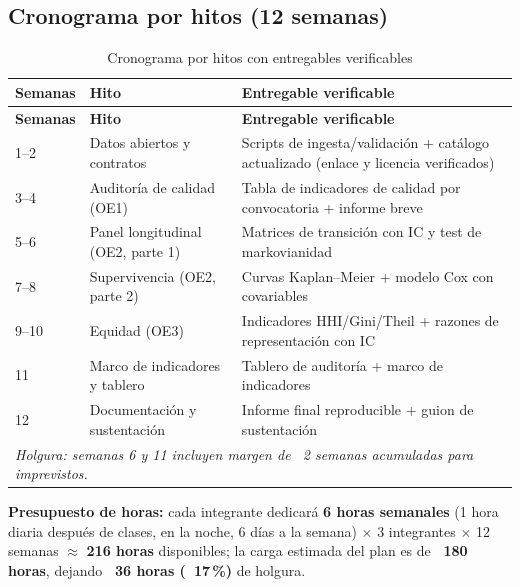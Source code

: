 \subsection{Cronograma por hitos (12 semanas)}

\begin{longtable}{p{2.1cm}p{6.4cm}p{4.9cm}}
\caption{Cronograma por hitos con entregables verificables}
\label{tab:cronograma}\\
\toprule
\textbf{Semanas} & \textbf{Hito} & \textbf{Entregable verificable} \\
\midrule
\endfirsthead
\toprule
\textbf{Semanas} & \textbf{Hito} & \textbf{Entregable verificable} \\
\midrule
\endhead
1--2 & Datos abiertos y contratos & Scripts de ingesta/validación + catálogo actualizado (enlace y licencia verificados) \\
3--4 & Auditoría de calidad (OE1) & Tabla de indicadores de calidad por convocatoria + informe breve \\
5--6 & Panel longitudinal (OE2, parte 1) & Matrices de transición con IC y test de markovianidad \\
7--8 & Supervivencia (OE2, parte 2) & Curvas Kaplan--Meier + modelo Cox con covariables \\
9--10 & Equidad (OE3) & Indicadores HHI/Gini/Theil + razones de representación con IC \\
11 & Marco de indicadores y tablero & Tablero de auditoría + marco de indicadores \\
12 & Documentación y sustentación & Informe final reproducible + guion de sustentación \\
\midrule
\multicolumn{3}{l}{\emph{Holgura: semanas 6 y 11 incluyen margen de ~2 semanas
acumuladas para imprevistos.}} \\
\bottomrule
\end{longtable}

\textbf{Presupuesto de horas:} cada integrante dedicará \textbf{6 horas
semanales} (1 hora diaria después de clases, en la noche, 6 días a la semana)
$\times$ 3 integrantes $\times$ 12 semanas $\approx$ \textbf{216 horas}
disponibles; la carga estimada del plan es de \textbf{~180 horas}, dejando
\textbf{~36 horas (~17\,\%)} de holgura.
